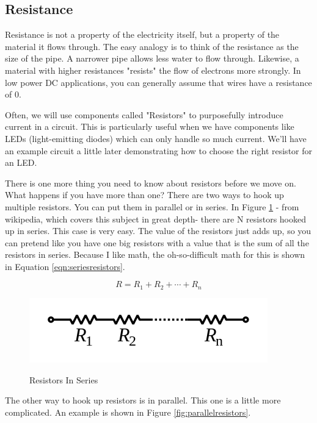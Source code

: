 \subsection{Resistance}

Resistance is not a property of the electricity itself, but a property of the material it flows through. The easy analogy is to think of the resistance as the size of the pipe. A narrower pipe allows less water to flow through. Likewise, a material with higher resistances "resists" the flow of electrons more strongly. In low power DC applications, you can generally assume that wires have a resistance of 0.

Often, we will use components called "Resistors" to purposefully introduce current in a circuit. This is particularly useful when we have components like LEDs (light-emitting diodes) which can only handle so much current. We'll have an example circuit a little later demonstrating how to choose the right resistor for an LED.

There is one more thing you need to know about resistors before we move on. What happens if you have more than one? There are two ways to hook up multiple resistors. You can put them in parallel or in series. In Figure \ref{fig:seriesresistors} - from wikipedia, which covers this subject in great depth- there are N resistors hooked up in series. This case is very easy. The value of the resistors just adds up, so you can pretend like you have one big resistors with a value that is the sum of all the resistors in series. Because I like math, the oh-so-difficult math for this is shown in Equation \ref{eqn:seriesresistors}.

\begin{equation}
R = R_1 + R_2 + \cdots + R_n
\label{eqn:seriesresistors}
\end{equation}

\begin{figure}[h]
\centering
\includegraphics[scale=0.75]{seriesresistors.png}
\label{fig:seriesresistors}
\caption{Resistors In Series}
\end{figure}

The other way to hook up resistors is in parallel. This one is a little more complicated. An example is shown in Figure \ref{fig:parallelresistors}.

